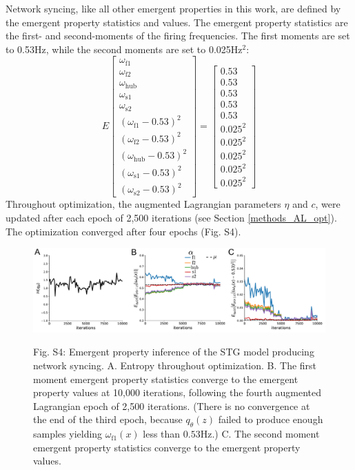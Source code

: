 \documentclass[11pt]{article}
\begin{document}
Network syncing, like all other emergent properties in this work, are defined by the emergent property statistics and values.  The emergent property statistics are the first- and second-moments of the firing frequencies. The first moments are set to 0.53Hz, while the second moments are set to 0.025Hz$^2$:
\begin{equation}
E \begin{bmatrix} \omega_{\text{f1}} \\ \omega_{\text{f2}} \\ \omega_{\text{hub}} \\ \omega_{\text{s1}} \\ \omega_{\text{s2}} \\ (\omega_{\text{f1}} - 0.53)^2 \\ (\omega_{\text{f2}} - 0.53)^2 \\ (\omega_{\text{hub}} - 0.53)^2 \\ (\omega_{\text{s1}} - 0.53)^2 \\ (\omega_{\text{s2}} - 0.53)^2  \end{bmatrix} = \begin{bmatrix} 0.53 \\ 0.53 \\ 0.53 \\ 0.53 \\ 0.53 \\ 0.025^2 \\ 0.025^2 \\ 0.025^2 \\ 0.025^2 \\ 0.025^2 \end{bmatrix}
\end{equation}
Throughout optimization, the augmented Lagrangian parameters $\eta$ and $c$, were updated after each epoch of 2,500 iterations (see Section \ref{methods_AL_opt}).  The optimization converged after four epochs (Fig. S4).

\begin{figure}
\begin{center}
\includegraphics[scale=0.4]{figures/figS5/figS5.pdf}
\end{center}
\begin{flushleft}
Fig. S4: Emergent property inference of the STG model producing network syncing. A. Entropy throughout optimization. B. The first moment emergent property statistics converge to the emergent property values at 10,000 iterations, following the fourth augmented Lagrangian epoch of 2,500 iterations.  (There is no convergence at the end of the third epoch, because $q_\theta(z)$ failed to produce enough samples yielding $\omega_{\text{f1}}(x)$ less than $0.53$Hz.)    C. The second moment emergent property statistics converge to the emergent property values.
\end{flushleft}
\end{figure}
\end{document}
